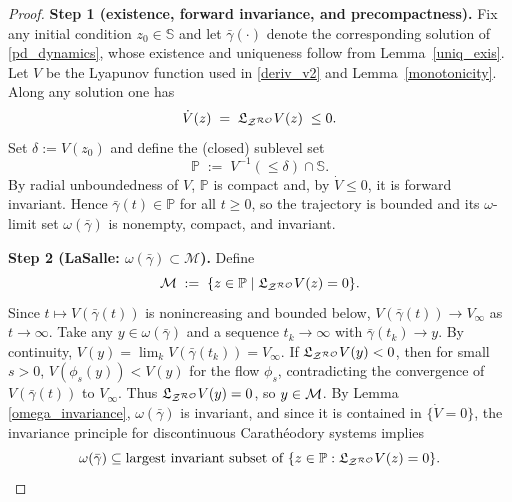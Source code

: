 \documentclass[journal,twoside,web]{ieeecolor}
\newcommand{\rev}[1]{#1}
\begin{document}
\iffalse
\begin{proof}
\rev{\textbf{Step 1 (existence, forward invariance, and precompactness).}
Fix any initial condition $z_0\in\mathbb S$ and let $\bar\gamma(\cdot)$ denote the corresponding solution of \eqref{pd_dynamics}, whose existence and uniqueness follow from Lemma~\ref{uniq_exis}.
Let $V$ be the Lyapunov function used in \eqref{deriv_v2} and Lemma~\ref{monotonicity}. Along any solution one has
\[
\dot V(z)\;=\;\mathfrak{L}_{{\cal Z}^{\cal RO}}V(z)\;\le 0.
\]
Set $\delta:=V(z_0)$ and define the (closed) sublevel set
\[
\mathbb P\;:=\;V^{-1}(\le \delta)\cap \mathbb S.
\]
By radial unboundedness of $V$, $\mathbb P$ is compact and, by $\dot V\le 0$, it is forward invariant. Hence $\bar\gamma(t)\in\mathbb P$ for all $t\ge 0$, so the trajectory is bounded and its $\omega$-limit set $\omega(\bar\gamma)$ is nonempty, compact, and invariant.}

\medskip
\rev{\textbf{Step 2 (LaSalle: $\omega(\bar\gamma)\subset \mathcal M$).}
Define
\[
{\cal M}\;:=\;\{z\in \mathbb P\mid \mathfrak{L}_{{\cal Z}^{\cal RO}}V(z)=0\}.
\]
Since $t\mapsto V(\bar\gamma(t))$ is nonincreasing and bounded below, $V(\bar\gamma(t))\to V_\infty$ as $t\to\infty$.
Take any $y\in \omega(\bar\gamma)$ and a sequence $t_k\to\infty$ with $\bar\gamma(t_k)\to y$. By continuity, $V(y)=\lim_k V(\bar\gamma(t_k))=V_\infty$.
If $\mathfrak{L}_{{\cal Z}^{\cal RO}}V(y)<0$, then for small $s>0$, $V(\phi_s(y))<V(y)$ for the flow $\phi_s$, contradicting the convergence of $V(\bar\gamma(t))$ to $V_\infty$.
Thus $\mathfrak{L}_{{\cal Z}^{\cal RO}}V(y)=0$, so $y\in{\cal M}$. By Lemma \ref{omega_invariance}, $\omega(\bar\gamma)$ is invariant, and since it is contained in $\{\dot V=0\}$, the invariance principle for discontinuous Carathéodory systems \cite[Prop.~2.1]{cherukuri2016} implies
\[
\omega(\bar\gamma)\subseteq \text{largest invariant subset of }\{z\in\mathbb P:\mathfrak{L}_{{\cal Z}^{\cal RO}}V(z)=0\}.
\]}


\end{proof}
\end{document}
